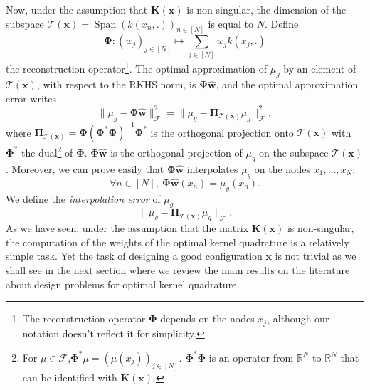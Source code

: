 \documentclass[twoside,11pt]{book}
\numberwithin{theorem}{chapter}
\numberwithin{definition}{chapter}
\numberwithin{proposition}{chapter}
\numberwithin{corollary}{chapter}
\numberwithin{example}{chapter}
\numberwithin{lemma}{chapter}
\numberwithin{assumption}{chapter}
\numberwithin{equation}{chapter}
\numberwithin{figure}{chapter}
\DeclareMathOperator{\Span}{\mathrm{Span}}
\begin{document}
Now, under the assumption that $\bm{K}(\bm{x})$ is non-singular, the dimension of the subspace $\mathcal{T}(\bm{x}) = \Span (k(x_{n},.))_{n \in [N]}$ is equal to $N$. Define 
\begin{equation}
	\bm{\Phi}:(w_{j})_{j \in [N]} \mapsto \sum_{j \in [N]} w_{j} k(x_{j},.)
\end{equation}
 the reconstruction operator\footnote{The reconstruction operator $\bm{\Phi}$ depends on the nodes $x_{j}$, although our notation doesn't reflect it for simplicity.}. The optimal approximation of $\mu_{g}$ by an element of $\mathcal{T}(\bm{x})$, with respect to the RKHS norm, is $\bm{\Phi}\hat{\bm{w}}$, and the optimal approximation error writes
\begin{equation}
\|\mu_{g} - \bm{\Phi}\hat{\bm{w}}\|^{2}_{\mathcal{F}} =\|\mu_{g} - \bm{\Pi}_{\mathcal{T}(\bm{x})}\mu_{g}\|^{2}_{\mathcal{F}},\label{e:finalTool}
\end{equation}
where $\bm{\Pi}_{\mathcal{T}(\bm{x})} = \bm{\Phi}(\bm{\Phi}^{*}\bm{\Phi})^{-1}\bm{\Phi}^{*}$ is the orthogonal projection onto $\mathcal{T}(\bm{x})$ with $\bm{\Phi}^{*}$ the dual\footnote{For $\mu \in \mathcal{F}$,$\bm{\Phi}^{*}\mu = (\mu(x_{j}))_{j \in [N]}$. $\bm{\Phi}^{*}\bm{\Phi}$ is an operator from $\mathbb{R}^{N}$ to $\mathbb{R}^{N}$ that can be identified with $\bm{K}(\bm{x})$.} of $\bm{\Phi}$. $\bm{\Phi}\hat{\bm{w}}$ is the orthogonal projection of $\mu_{g}$ on the subspace $\mathcal{T}(\bm{x})$. Moreover, we can prove easily that $\bm{\Phi}\hat{\bm{w}}$ interpolates $\mu_{g}$ on the nodes $x_{1}, \dots, x_{N}$:
\begin{equation}
\forall n \in [N], \:\bm{\Phi}\hat{\bm{w}}(x_{n}) = \mu_{g}(x_{n}).
\end{equation}
We define the \emph{interpolation error} of $\mu_{g}$
\begin{equation}\label{e:interpolation_error_def}
\|\mu_{g}- \bm{\Pi}_{\mathcal{T}(\bm{x})}\mu_{g}\|_{\mathcal{F}}.
\end{equation}
As we have seen, under the assumption that the matrix $\bm{K}(\bm{x})$ is non-singular, the computation of the weights of the optimal kernel quadrature is a relatively simple task. Yet the task of designing a good configuration $\bm{x}$ is not trivial as we shall see in the next section where we review the main results on the literature about design problems for optimal kernel quadrature.
\end{document}
